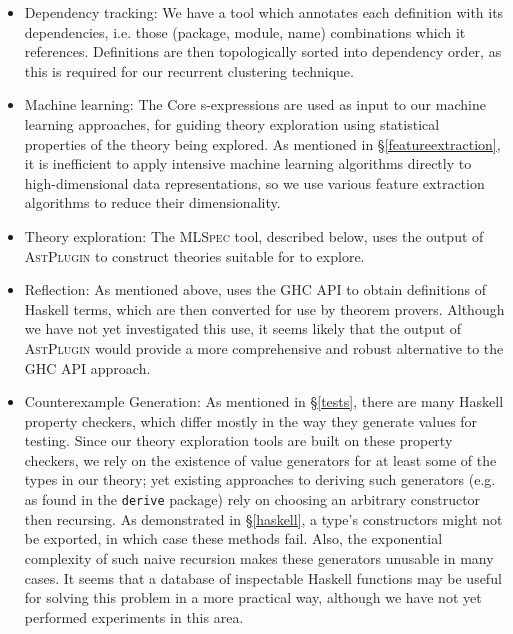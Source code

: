 \begin{itemize}
  \item{Dependency tracking}: We have a tool which annotates each definition with its dependencies, i.e. those (package, module, name) combinations which it references. Definitions are then topologically sorted into dependency order, as this is required for our recurrent clustering technique.

  \item{Machine learning}: The Core s-expressions are used as input to our machine learning approaches, for guiding theory exploration using statistical properties of the theory being explored. As mentioned in \S \ref{featureextraction}, it is inefficient to apply intensive machine learning algorithms directly to high-dimensional data representations, so we use various feature extraction algorithms to reduce their dimensionality.

  \item{Theory exploration}: The \textsc{MLSpec} tool, described below, uses the output of \textsc{AstPlugin} to construct theories suitable for \qspec{} to explore.

  \item{Reflection}: As mentioned above, \hspec{} uses the GHC API to obtain definitions of Haskell terms, which are then converted for use by theorem provers. Although we have not yet investigated this use, it seems likely that the output of \textsc{AstPlugin} would provide a more comprehensive and robust alternative to the GHC API approach.

  \item{Counterexample Generation}: As mentioned in \S \ref{tests}, there are many Haskell property checkers, which differ mostly in the way they generate values for testing. Since our theory exploration tools are built on these property checkers, we rely on the existence of value generators for at least some of the types in our theory; yet existing approaches to deriving such generators (e.g. as found in the \texttt{derive} package) rely on choosing an arbitrary constructor then recursing. As demonstrated in \S \ref{haskell}, a type's constructors might not be exported, in which case these methods fail. Also, the exponential complexity of such naive recursion makes these generators unusable in many cases. It seems that a database of inspectable Haskell functions may be useful for solving this problem in a more practical way, although we have not yet performed experiments in this area.
\end{itemize}

